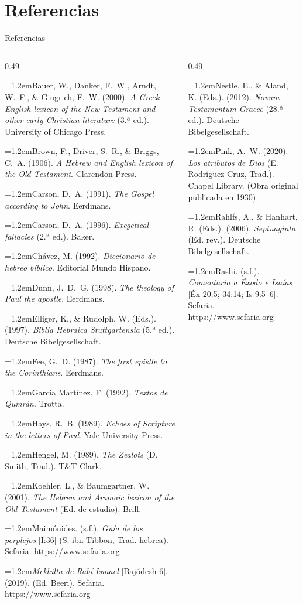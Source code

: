 \documentclass[hyperref={bookmarks=false},aspectratio=169]{beamer}
\newcommand{\refapa}[1]{\par{\RaggedRight\hangindent=1.2em\hangafter=1\noindent #1\par}\vspace{3pt}}
\begin{document}
\section{Referencias}

\begin{frame}{Referencias}
\fontsize{5.4}{6.4}\selectfont
\begin{columns}[t,onlytextwidth]
\begin{column}{0.49\textwidth}
\refapa{Bauer, W., Danker, F.~W., Arndt, W.~F., \& Gingrich, F.~W. (2000). \emph{A Greek-English lexicon of the New Testament and other early Christian literature} (3.ª ed.). University of Chicago Press.}
\refapa{Brown, F., Driver, S.~R., \& Briggs, C.~A. (1906). \emph{A Hebrew and English lexicon of the Old Testament}. Clarendon Press.}
\refapa{Carson, D.~A. (1991). \emph{The Gospel according to John}. Eerdmans.}
\refapa{Carson, D.~A. (1996). \emph{Exegetical fallacies} (2.ª ed.). Baker.}
\refapa{Chávez, M. (1992). \emph{Diccionario de hebreo bíblico}. Editorial Mundo Hispano.}
\refapa{Dunn, J.~D.~G. (1998). \emph{The theology of Paul the apostle}. Eerdmans.}
\refapa{Elliger, K., \& Rudolph, W. (Eds.). (1997). \emph{Biblia Hebraica Stuttgartensia} (5.ª ed.). Deutsche Bibelgesellschaft.}
\refapa{Fee, G.~D. (1987). \emph{The first epistle to the Corinthians}. Eerdmans.}
\refapa{García Martínez, F. (1992). \emph{Textos de Qumrán}. Trotta.}
\refapa{Hays, R.~B. (1989). \emph{Echoes of Scripture in the letters of Paul}. Yale University Press.}
\refapa{Hengel, M. (1989). \emph{The Zealots} (D. Smith, Trad.). T\&T Clark.}
\refapa{Koehler, L., \& Baumgartner, W. (2001). \emph{The Hebrew and Aramaic lexicon of the Old Testament} (Ed. de estudio). Brill.}
\refapa{Maimónides. (s.f.). \emph{Guía de los perplejos} [I:36] (S. ibn Tibbon, Trad. hebrea). Sefaria. https://www.sefaria.org}
\refapa{\emph{Mekhilta de Rabí Ismael} [Bajódesh 6]. (2019). (Ed. Beeri). Sefaria. https://www.sefaria.org}
\end{column}
\begin{column}{0.49\textwidth}
\refapa{Nestle, E., \& Aland, K. (Eds.). (2012). \emph{Novum Testamentum Graece} (28.ª ed.). Deutsche Bibelgesellschaft.}
\refapa{Pink, A.~W. (2020). \emph{Los atributos de Dios} (E. Rodríguez Cruz, Trad.). Chapel Library. (Obra original publicada en 1930)}
\refapa{Rahlfs, A., \& Hanhart, R. (Eds.). (2006). \emph{Septuaginta} (Ed. rev.). Deutsche Bibelgesellschaft.}
\refapa{Rashi. (s.f.). \emph{Comentario a Éxodo e Isaías} [Éx 20:5; 34:14; Is 9:5--6]. Sefaria. https://www.sefaria.org}

\end{column}
\end{columns}
\end{frame}
\end{document}
